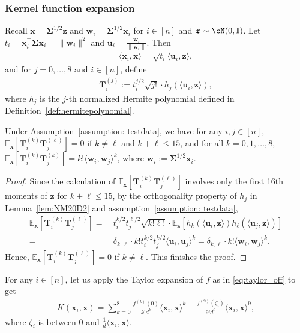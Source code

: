 \documentclass[twoside,11pt]{article}
\newcommand{\bw}{\boldsymbol{w}}
\newcommand{\E}{\mathbb{E}}
\def\bI{{\mathbf I}}
\def\bu{{\boldsymbol u}}
\def\bw{{\boldsymbol w}}
\def\bx{{\boldsymbol x}}
\def\bz{{\boldsymbol z}}
\def\bSigma{{\boldsymbol \Sigma}}
\def\T{{\mathbb T}}
\def\T{{\mathbb T}}
\renewcommand{\T}{\boldsymbol{T}}
\newcommand{\w}{\mbi{w}}
\newcommand{\1}{\mathbf{1}}
\def\mbi#1{\boldsymbol{#1}}
\def\mbi#1{\boldsymbol{#1}} %
\begin{document}
\subsubsection{Kernel function expansion}
Recall $\bx=\bSigma^{1/2}\bz$ and $\w_i=\bSigma^{1/2} \bx_i$ for $i\in[n]$ and $\bz\sim\cN(0,\bI)$. Let $t_{i}=\bx_i^\top\bSigma\bx_i=\|\w_i\|^2$ and $\bu_i=\frac{\w_i}{\|\w_i\|}$. Then 
\begin{align}\label{eq:xx_i}
  \langle \bx_i,\bx\rangle=\sqrt{t_i} \langle \bu_i, \bz\rangle,
\end{align}
and for $j=0,\dots, 8$ and $i\in[n]$, define
\begin{align}\label{eq:Tij}
    \T_i^{(j)}:=t_i^{j/2}\sqrt{j!}\cdot h_j\left( \langle \bu_i, \bz\rangle \right),
\end{align}
where $h_j$ is the $j$-th normalized Hermite polynomial defined in Definition~\ref{def:hermitepolynomial}. 
    
\begin{lemma}\label{lem:hermite}
Under Assumption~\ref{assumption: testdata}, we have for any $i,j\in [n]$,
    $\E_{\bx}[\T_i^{(k)}\T_j^{(\ell)}]=0$ if $k\neq\ell$ and $k+\ell\leq 15$, and  for all $k=0,1,\ldots,8$,
    $\E_{\bx}[\T_i^{(k)}\T_j^{(k)}]=k!\langle \bw_i, \bw_j\rangle^{k}$, where $\bw_i:=\bSigma^{1/2}\bx_i$. 
\end{lemma}
\begin{proof}
Since the calculation of $\E_{\bx}[\T_i^{(k)}\T_j^{(\ell)}]$ involves only  the first 16th moments of $\bz$ for $k+\ell\leq 15$,  by the orthogonality property of $h_j$ in Lemma~\ref{lem:NM20D2} and  assumption~\ref{assumption: testdata},
    \begin{align}
        \E_{\bx}[\T_i^{(k)}\T_j^{(\ell)}]=~&t_i^{k/2}t_j^{\ell/2}\sqrt{k!\ell !}\cdot\E_{\bz}[h_k\left( \langle \bu_i, \bz\rangle \right)h_{\ell}(\langle \bu_j, \bz\rangle )]\\
        =~&\delta_{k,\ell}\cdot k! t_i^{k/2}t_j^{k/2}\langle \bu_i, \bu_j\rangle^{k}=\delta_{k,\ell} \cdot k!\langle \bw_i, \bw_j\rangle^{k}.
    \end{align}
   Hence, $\E_{\bx}[\T_i^{(k)}\T_j^{(\ell)}]=0$ if $k\not=\ell$. This finishes the proof.
\end{proof}



For any $i\in[n]$, let us apply the Taylor expansion  of $f$ as in \eqref{eq:taylor_off}  to get
\begin{align} 
K(\bx_i,\bx)=\sum_{k=0}^{8}\frac{f^{(k)}(0)}{k!d^k} \langle \bx_i,\bx \rangle^k+\frac{f^{(9)}(\zeta_{i})}{9!d^9}\langle \bx_i,\bx \rangle^9,
\end{align}
where $\zeta_{i}$ is between $0$ and $\frac{1}{d}\langle \bx_i, \bx \rangle$. 
\end{document}
